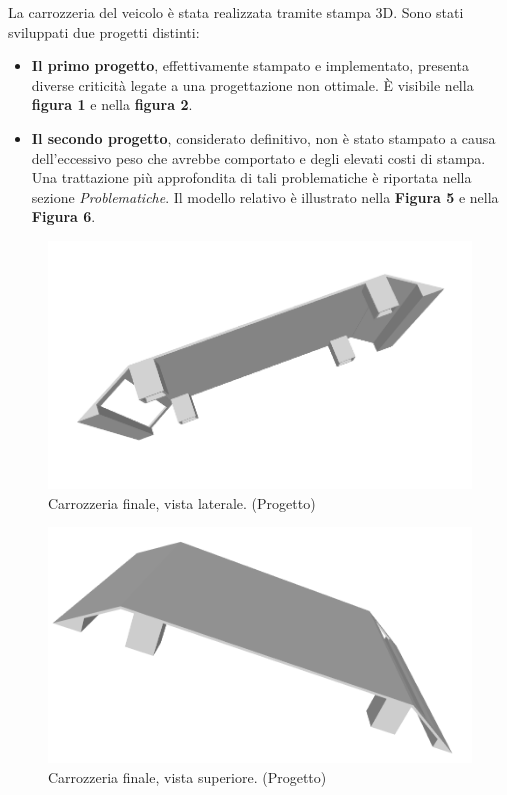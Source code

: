\documentclass{article}
\begin{document}
La carrozzeria del veicolo è stata realizzata tramite stampa 3D. Sono stati sviluppati due progetti distinti:

\begin{itemize}
    \item \textbf{Il primo progetto}, effettivamente stampato e implementato, presenta diverse criticità legate a una progettazione non ottimale. È visibile nella \textbf{figura 1} e nella \textbf{figura 2}.

    \item \textbf{Il secondo progetto}, considerato definitivo, non è stato stampato a causa dell’eccessivo peso che avrebbe comportato e degli elevati costi di stampa. Una trattazione più approfondita di tali problematiche è riportata nella sezione \textit{Problematiche}. Il modello relativo è illustrato nella \textbf{Figura 5} e nella \textbf{Figura 6}.
\end{itemize}

\begin{figure}
    \centering
    \includegraphics[width=0.5\linewidth]{imgs/carrozzeria_final.png}
    \caption{Carrozzeria finale, vista laterale. (Progetto)}
    \label{fig:enter-label}
\end{figure}
\begin{figure}
    \centering
    \includegraphics[width=0.5\linewidth]{imgs/carrozzeria_final_2.png}
    \caption{Carrozzeria finale, vista superiore. (Progetto)}
    \label{fig:enter-label}
\end{figure}
\end{document}
